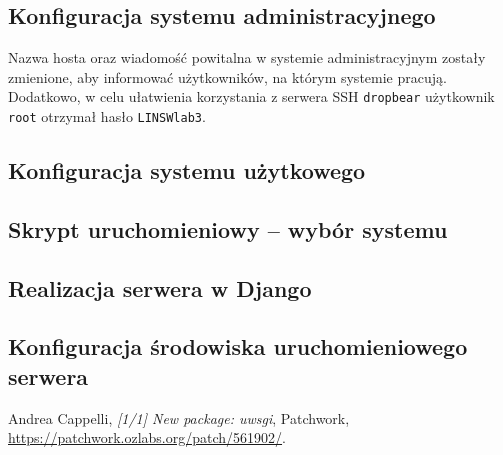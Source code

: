 \documentclass[10pt,a4paper]{article}
\begin{document}
\subsection{Konfiguracja systemu administracyjnego}

Nazwa hosta oraz wiadomość powitalna w systemie administracyjnym zostały zmienione, aby
informować użytkowników, na którym systemie pracują. Dodatkowo, w celu ułatwienia korzystania
z serwera SSH \texttt{dropbear} użytkownik \texttt{root} otrzymał hasło \texttt{LINSWlab3}.

\subsection{Konfiguracja systemu użytkowego}

\subsection{Skrypt uruchomieniowy -- wybór systemu}

\subsection{Realizacja serwera w Django}

\subsection{Konfiguracja środowiska uruchomieniowego serwera}

\begin{thebibliography}{9}
		Andrea Cappelli,
		\emph{[1/1] New package: uwsgi},
		Patchwork,
		\url{https://patchwork.ozlabs.org/patch/561902/}.
\end{thebibliography}
\end{document}
